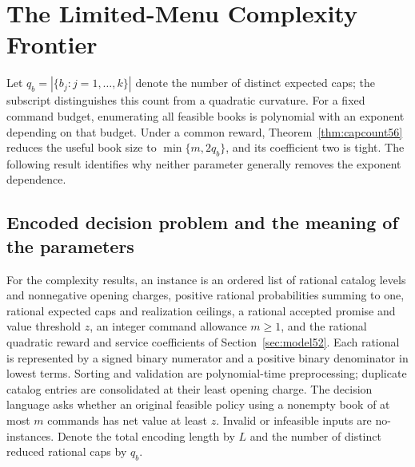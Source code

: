 \documentclass[11pt,letterpaper]{article}
\theoremstyle{definition}\newtheorem{remark}[theorem]{Remark}
\begin{document}
\section{The Limited-Menu Complexity Frontier}\label{sec:param59}
Let $q_b=|\{b_j:j=1,\ldots,k\}|$ denote the number of distinct expected caps; the subscript distinguishes this count from a quadratic curvature. For a fixed command budget, enumerating all feasible books is polynomial with an exponent depending on that budget. Under a common reward, Theorem~\ref{thm:capcount56} reduces the useful book size to $\min\{m,2q_b\}$, and its coefficient two is tight. The following result identifies why neither parameter generally removes the exponent dependence.

\subsection{Encoded decision problem and the meaning of the parameters}\label{sec:decision60}
For the complexity results, an instance is an ordered list of rational catalog levels and nonnegative opening charges, positive rational probabilities summing to one, rational expected caps and realization ceilings, a rational accepted promise and value threshold $z$, an integer command allowance $m\geq1$, and the rational quadratic reward and service coefficients of Section~\ref{sec:model52}. Each rational is represented by a signed binary numerator and a positive binary denominator in lowest terms. Sorting and validation are polynomial-time preprocessing; duplicate catalog entries are consolidated at their least opening charge. The decision language asks whether an original feasible policy using a nonempty book of at most $m$ commands has net value at least $z$. Invalid or infeasible inputs are no-instances. Denote the total encoding length by $L$ and the number of distinct reduced rational caps by $q_b$.
\end{document}
